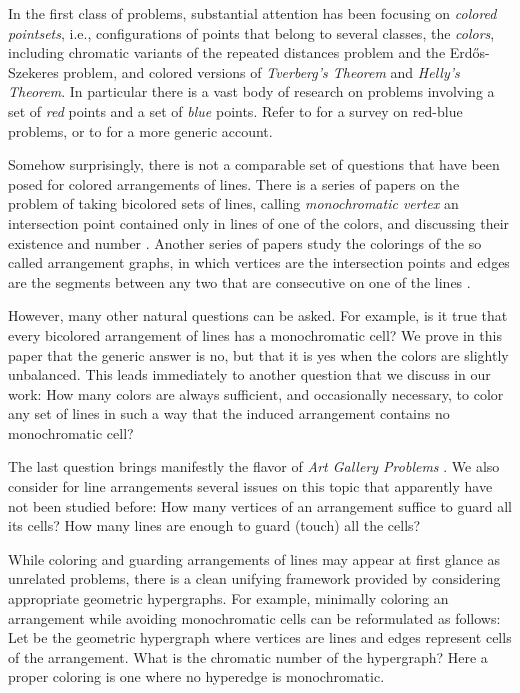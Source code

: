 \documentclass[11pt,a4paper]{article}
\begin{document}
In the first class of problems, substantial attention has been focusing on \emph{colored pointsets}, i.e., configurations of points that belong to several classes, the \emph{colors}, including chromatic variants of the repeated distances problem and the Erd\H{o}s-Szekeres problem, and colored versions of \emph{Tverberg's Theorem} and \emph{Helly's Theorem}. In particular there is a vast body of research on problems involving a set of \emph{red} points and a set of \emph{blue} points. Refer to \cite{KK} for a survey on red-blue problems, or to \cite{BMP} for a more generic account.

Somehow surprisingly, there is not a comparable set of questions that have been posed for colored arrangements of lines. There is a series of papers on the problem of taking bicolored sets of lines, calling \emph{monochromatic vertex} an intersection point contained only in lines of one of the colors, and discussing their existence and number \cite{Gru3,Gru4,Mo}. Another series of papers study the colorings of the so called arrangement graphs, in which vertices are the intersection points and edges are the segments between any two that are consecutive on one of the lines \cite{BEW,FHNS}.

However, many other natural questions can be asked. For example, is it true that every bicolored arrangement of lines has a monochromatic cell? We prove in this paper that the generic answer is no, but that it is yes when the colors are slightly unbalanced. This leads immediately to another question that we discuss in our work: How many colors are always sufficient, and occasionally necessary, to color any set of  lines in such a way that the induced arrangement contains no monochromatic cell?

The last question brings manifestly the flavor of \emph{Art Gallery Problems} \cite{OR1,OR2,URR}. We also consider for line arrangements several issues on this topic that apparently have not been studied before: How many vertices of an arrangement suffice to guard all its cells? How many lines are enough to guard (touch) all the cells?

While coloring and guarding arrangements of lines may appear at first glance as unrelated problems, there is a clean unifying framework provided by considering appropriate geometric hypergraphs. For example, minimally coloring an arrangement while avoiding monochromatic cells can be reformulated as follows: Let  be the geometric hypergraph where vertices are lines and edges represent cells of the arrangement. What is the chromatic number of the hypergraph? Here a proper coloring is one where no hyperedge is monochromatic.
\end{document}
